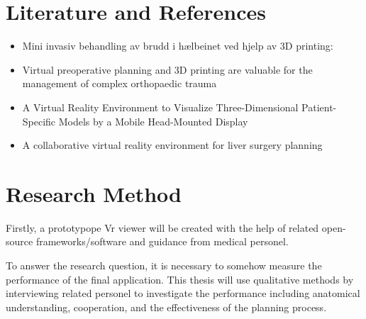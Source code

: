 \documentclass[11pt]{scrartcl}
\begin{document}
\section{Literature and References}
\begin{itemize}
\item Mini invasiv behandling av brudd i hælbeinet ved hjelp av 3D printing:


\item Virtual preoperative planning and 3D printing are valuable for the management of complex orthopaedic trauma


\item A Virtual Reality Environment to Visualize Three-Dimensional Patient-Specific Models by a Mobile Head-Mounted Display


\item A collaborative virtual reality environment for liver surgery planning
\end{itemize}

\section{Research Method}
Firstly, a prototypope Vr viewer will be created with the help of related open-source frameworks/software and guidance from medical personel.

To answer the research question, it is necessary to somehow measure the performance of the final application. This thesis will use qualitative methods by interviewing related personel to investigate the performance including anatomical understanding, cooperation, and the effectiveness of the planning process. 
\end{document}
